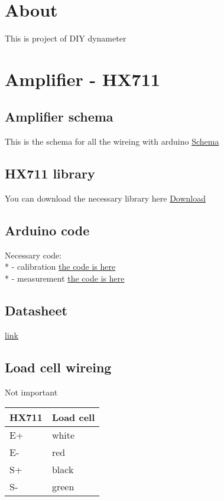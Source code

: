 \documentclass[11pt]{article}
\author{Jacob}
\date{\today}
\title{}
\begin{document}
\tableofcontents

\section{About}
\label{sec:orgd1539f2}
This is project of DIY dynameter
\section{Amplifier - HX711}
\label{sec:org4153932}
\subsection{Amplifier schema}
\label{sec:org9eb0a06}
This is the schema for all the wireing with arduino
 \href{amplifier\_schema.png}{Schema}
\subsection{HX711 library}
\label{sec:org4babe4f}
You can download the necessary library here
\href{https://halckemy.s3.amazonaws.com/uploads/attachments/392655/HX711-master.zip}{Download}
\subsection{Arduino code}
\label{sec:org9f628ee}
Necessary code:
\\*
  - calibration
\href{calibration.int}{the code is here}
\\*
  - measurement
\href{measurement.ino}{the code is here}
\subsection{Datasheet}
\label{sec:org02fad90}
\href{https://circuits4you.com/wp-content/uploads/2016/11/hx711\_datasheet\_english.pdf}{link}
\subsection{Load cell wireing}
\label{sec:orgbceb45d}
Not important
\begin{center}
\begin{tabular}{ll}
HX711 & Load cell\\
\hline
E+ & white\\
E- & red\\
S+ & black\\
S- & green\\
\end{tabular}
\end{center}
\end{document}
